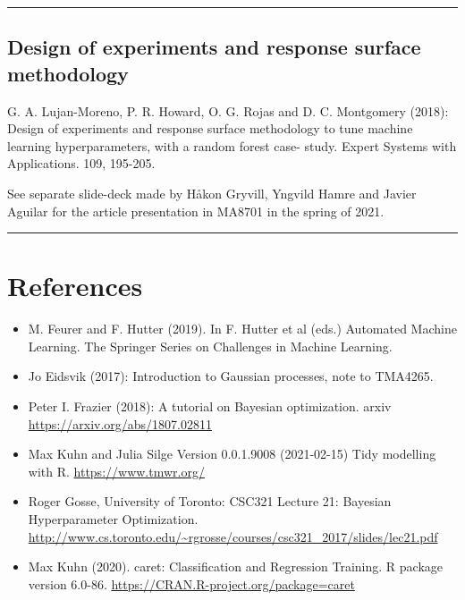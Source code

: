 \documentclass[
  letterpaper,
  DIV=11,
  numbers=noendperiod]{scrartcl}
\begin{document}
\begin{center}\rule{0.5\linewidth}{0.5pt}\end{center}

\hypertarget{design-of-experiments-and-response-surface-methodology}{%
\subsection{Design of experiments and response surface
methodology}\label{design-of-experiments-and-response-surface-methodology}}

G. A. Lujan-Moreno, P. R. Howard, O. G. Rojas and D. C. Montgomery
(2018): Design of experiments and response surface methodology to tune
machine learning hyperparameters, with a random forest case- study.
Expert Systems with Applications. 109, 195-205.

See separate slide-deck made by Håkon Gryvill, Yngvild Hamre and Javier
Aguilar for the article presentation in MA8701 in the spring of 2021.

\begin{center}\rule{0.5\linewidth}{0.5pt}\end{center}

\hypertarget{references}{%
\section{References}\label{references}}

\begin{itemize}
\item
  M. Feurer and F. Hutter (2019). In F. Hutter et al (eds.) Automated
  Machine Learning. The Springer Series on Challenges in Machine
  Learning.
\item
  Jo Eidsvik (2017): Introduction to Gaussian processes, note to
  TMA4265.
\item
  Peter I. Frazier (2018): A tutorial on Bayesian optimization. arxiv
  \url{https://arxiv.org/abs/1807.02811}
\item
  Max Kuhn and Julia Silge Version 0.0.1.9008 (2021-02-15) Tidy
  modelling with R. \url{https://www.tmwr.org/}
\item
  Roger Gosse, University of Toronto: CSC321 Lecture 21: Bayesian
  Hyperparameter Optimization.
  \url{http://www.cs.toronto.edu/~rgrosse/courses/csc321_2017/slides/lec21.pdf}
\item
  Max Kuhn (2020). caret: Classification and Regression Training. R
  package version 6.0-86. \url{https://CRAN.R-project.org/package=caret}
\end{itemize}
\end{document}
